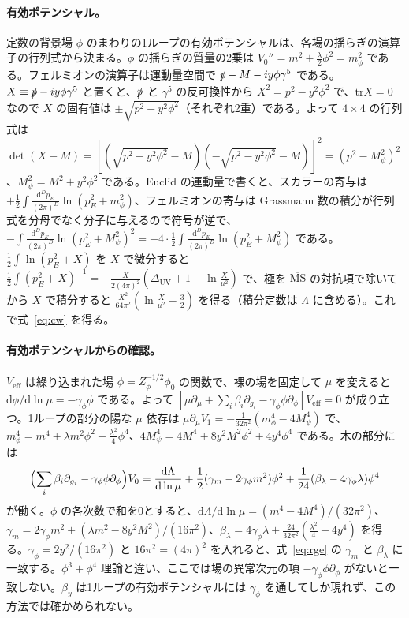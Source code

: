 \documentclass[a4paper,10pt]{ltjsarticle}
\newcommand{\dd}{\mathrm{d}}
\newcommand{\MSbar}{\overline{\mathrm{MS}}}
\begin{document}
\paragraph{有効ポテンシャル。}定数の背景場 $\phi$ のまわりの1ループの有効ポテンシャルは、各場の揺らぎの演算子の行列式から決まる。$\phi$ の揺らぎの質量の2乗は $V_0''=m^2+\frac\lambda2\phi^2=m_\phi^2$ である。フェルミオンの演算子は運動量空間で $\slashed p-M-iy\phi\gamma^5$ である。$X\equiv\slashed p-iy\phi\gamma^5$ と置くと、$\slashed p$ と $\gamma^5$ の反可換性から $X^2=p^2-y^2\phi^2$ で、$\mathrm{tr}X=0$ なので $X$ の固有値は $\pm\sqrt{p^2-y^2\phi^2}$（それぞれ2重）である。よって $4\times4$ の行列式は $\det(X-M)=[(\sqrt{p^2-y^2\phi^2}-M)(-\sqrt{p^2-y^2\phi^2}-M)]^2=(p^2-M_\psi^2)^2$、$M_\psi^2=M^2+y^2\phi^2$ である。Euclid の運動量で書くと、スカラーの寄与は $+\frac12\int\frac{\dd^Dp_E}{(2\pi)^D}\ln(p_E^2+m_\phi^2)$、フェルミオンの寄与は Grassmann 数の積分が行列式を分母でなく分子に与えるので符号が逆で、$-\int\frac{\dd^Dp_E}{(2\pi)^D}\ln(p_E^2+M_\psi^2)^2=-4\cdot\frac12\int\frac{\dd^Dp_E}{(2\pi)^D}\ln(p_E^2+M_\psi^2)$ である。$\frac12\int\ln(p_E^2+X)$ を $X$ で微分すると $\frac12\int(p_E^2+X)^{-1}=-\frac{X}{2(4\pi)^2}(\Delta_{\mathrm{UV}}+1-\ln\frac{X}{\mu^2})$ で、極を $\MSbar$ の対抗項で除いてから $X$ で積分すると $\frac{X^2}{64\pi^2}(\ln\frac{X}{\mu^2}-\frac32)$ を得る（積分定数は $\Lambda$ に含める）。これで式~\eqref{eq:cw} を得る。

\paragraph{有効ポテンシャルからの確認。}$V_{\mathrm{eff}}$ は繰り込まれた場 $\phi=Z_\phi^{-1/2}\phi_0$ の関数で、裸の場を固定して $\mu$ を変えると $\dd\phi/\dd\ln\mu=-\gamma_\phi\phi$ である。よって $[\mu\partial_\mu+\sum_i\beta_i\partial_{g_i}-\gamma_\phi\phi\partial_\phi]V_{\mathrm{eff}}=0$ が成り立つ。1ループの部分の陽な $\mu$ 依存は $\mu\partial_\mu V_1=-\frac{1}{32\pi^2}(m_\phi^4-4M_\psi^4)$ で、$m_\phi^4=m^4+\lambda m^2\phi^2+\frac{\lambda^2}{4}\phi^4$、$4M_\psi^4=4M^4+8y^2M^2\phi^2+4y^4\phi^4$ である。木の部分には
\begin{equation*}
\Bigl(\sum_i\beta_i\partial_{g_i}-\gamma_\phi\phi\partial_\phi\Bigr)V_0=\frac{\dd\Lambda}{\dd\ln\mu}+\frac12(\gamma_m-2\gamma_\phi m^2)\phi^2+\frac{1}{24}(\beta_\lambda-4\gamma_\phi\lambda)\phi^4
\end{equation*}
が働く。$\phi$ の各次数で和を0とすると、$\dd\Lambda/\dd\ln\mu=(m^4-4M^4)/(32\pi^2)$、$\gamma_m=2\gamma_\phi m^2+(\lambda m^2-8y^2M^2)/(16\pi^2)$、$\beta_\lambda=4\gamma_\phi\lambda+\frac{24}{32\pi^2}(\frac{\lambda^2}{4}-4y^4)$ を得る。$\gamma_\phi=2y^2/(16\pi^2)$ と $16\pi^2=(4\pi)^2$ を入れると、式~\eqref{eq:rge} の $\gamma_m$ と $\beta_\lambda$ に一致する。$\phi^3+\phi^4$ 理論と違い、ここでは場の異常次元の項 $-\gamma_\phi\phi\partial_\phi$ がないと一致しない。$\beta_y$ は1ループの有効ポテンシャルには $\gamma_\phi$ を通してしか現れず、この方法では確かめられない。
\end{document}
